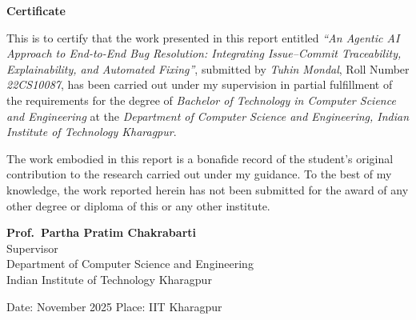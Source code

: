 \begin{center}
    \textbf{\Large Certificate}\\[0.4in]
\end{center}

This is to certify that the work presented in this report entitled \emph{``An Agentic AI Approach to End-to-End Bug Resolution: Integrating Issue–Commit Traceability, Explainability, and Automated Fixing''}, submitted by \emph{Tuhin Mondal}, Roll Number \emph{22CS10087}, has been carried out under my supervision in partial fulfillment of the requirements for the degree of \emph{Bachelor of Technology in Computer Science and Engineering} at the \emph{Department of Computer Science and Engineering, Indian Institute of Technology Kharagpur}.\\

\vspace{0.1in}

The work embodied in this report is a bonafide record of the student’s original contribution to the research carried out under my guidance. To the best of my knowledge, the work reported herein has not been submitted for the award of any other degree or diploma of this or any other institute.

\vspace{4in}

\begin{flushright}
\textbf{Prof.\ Partha Pratim Chakrabarti}\\
Supervisor\\
Department of Computer Science and Engineering\\
Indian Institute of Technology Kharagpur\\
\end{flushright}

\vspace{0.8in}
\noindent
Date: November 2025 \hfill Place: IIT Kharagpur

\newpage
